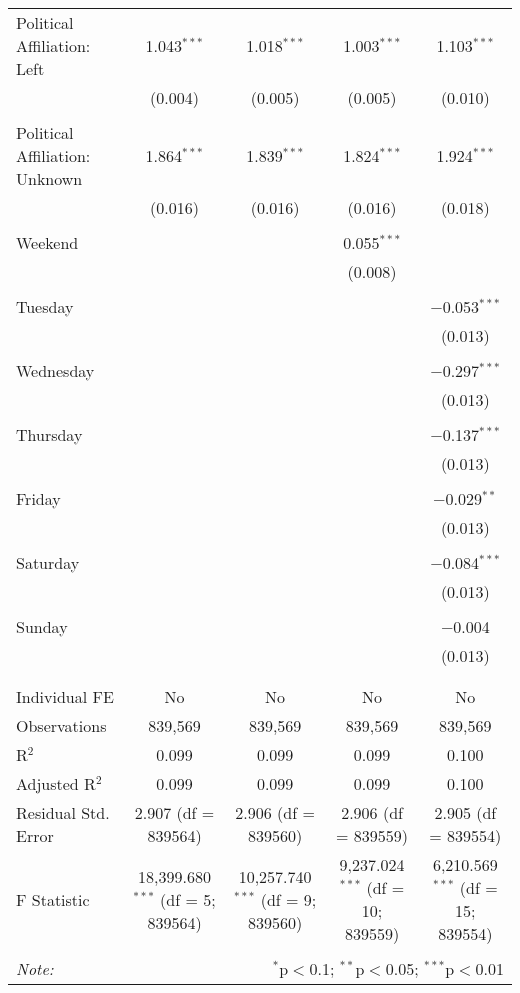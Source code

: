 \documentclass[
]{article}
\begin{document}
\begin{table}[!htbp]
{\begin{tabular}{@{\extracolsep{5pt}}lcccc}
 Political Affiliation: Left & 1.043$^{***}$ & 1.018$^{***}$ & 1.003$^{***}$ & 1.103$^{***}$ \\ 
  & (0.004) & (0.005) & (0.005) & (0.010) \\ 
  & & & & \\ 
 Political Affiliation: Unknown & 1.864$^{***}$ & 1.839$^{***}$ & 1.824$^{***}$ & 1.924$^{***}$ \\ 
  & (0.016) & (0.016) & (0.016) & (0.018) \\ 
  & & & & \\ 
 Weekend &  &  & 0.055$^{***}$ &  \\ 
  &  &  & (0.008) &  \\ 
  & & & & \\ 
 Tuesday &  &  &  & $-$0.053$^{***}$ \\ 
  &  &  &  & (0.013) \\ 
  & & & & \\ 
 Wednesday &  &  &  & $-$0.297$^{***}$ \\ 
  &  &  &  & (0.013) \\ 
  & & & & \\ 
 Thursday &  &  &  & $-$0.137$^{***}$ \\ 
  &  &  &  & (0.013) \\ 
  & & & & \\ 
 Friday &  &  &  & $-$0.029$^{**}$ \\ 
  &  &  &  & (0.013) \\ 
  & & & & \\ 
 Saturday &  &  &  & $-$0.084$^{***}$ \\ 
  &  &  &  & (0.013) \\ 
  & & & & \\ 
 Sunday &  &  &  & $-$0.004 \\ 
  &  &  &  & (0.013) \\ 
  & & & & \\ 
\hline \\[-1.8ex] 
Individual FE & No & No & No & No \\ 
Observations & 839,569 & 839,569 & 839,569 & 839,569 \\ 
R$^{2}$ & 0.099 & 0.099 & 0.099 & 0.100 \\ 
Adjusted R$^{2}$ & 0.099 & 0.099 & 0.099 & 0.100 \\ 
Residual Std. Error & 2.907 (df = 839564) & 2.906 (df = 839560) & 2.906 (df = 839559) & 2.905 (df = 839554) \\ 
F Statistic & 18,399.680$^{***}$ (df = 5; 839564) & 10,257.740$^{***}$ (df = 9; 839560) & 9,237.024$^{***}$ (df = 10; 839559) & 6,210.569$^{***}$ (df = 15; 839554) \\ 
\hline 
\hline \\[-1.8ex] 
\textit{Note:}  & \multicolumn{4}{r}{$^{*}$p$<$0.1; $^{**}$p$<$0.05; $^{***}$p$<$0.01} \\ 
\end{tabular}
} 
\end{table} 
\newpage
\end{document}
